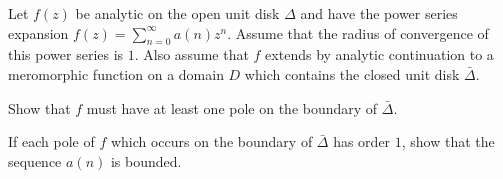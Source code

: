Let $f(z)$ be analytic on the open unit disk $\Delta$ and have the
power series expansion $f(z)=\sum_{n=0}^{\infty}a(n)z^n$. Assume that
the radius of convergence of this power series is $1$. Also assume
that $f$ extends by analytic continuation to a meromorphic function on
a domain $D$ which contains the closed unit disk $\bar{\Delta}$.
\begin{alist}
\item Show that $f$ must have at least one pole on the boundary of 
$\bar{\Delta}$.
\item If each pole of $f$ which occurs on the boundary of
$\bar{\Delta}$ has order $1$, show that the sequence $a(n)$ is bounded.
\end{alist}
